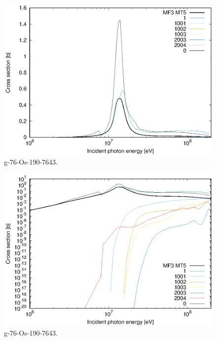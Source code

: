 \begin{figure}
 \includegraphics[width=\linewidth]{eps/g_76-Os-190_7643.eps}
  \caption{g-76-Os-190-7643.}
\end{figure}
\begin{figure}
 \includegraphics[width=\linewidth]{eps-log/g_76-Os-190_7643.eps}
 \caption{g-76-Os-190-7643.}
\end{figure}
\newpage \clearpage

